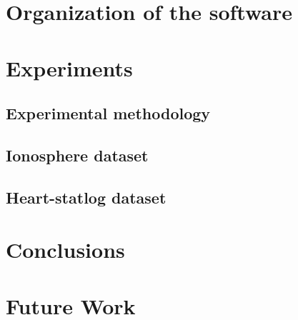 \documentclass[10pt, journal]{IEEEtran}
\begin{document}

\section{Organization of the software} %
\label{sec:organization_of_the_software}



\section{Experiments} %
\label{sec:experiments}

\subsection{Experimental methodology} %
\label{sub:experimental_methodology}


\subsection{Ionosphere dataset} %
\label{sub:ionosphere_dataset}


\subsection{Heart-statlog dataset} %
\label{sub:heart_statlog_dataset}


\section{Conclusions} %
\label{sec:conclusions}


\section{Future Work} %
\label{sec:future_work}




\end{document}
